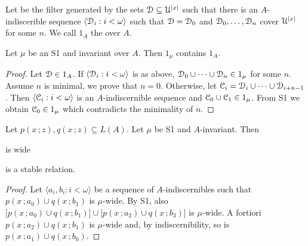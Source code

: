 \documentclass{amsproc}
\renewcommand*{\emph}[1]{%
   \smash{\tikz[baseline]\node[rectangle, fill=teal!25, rounded corners, inner xsep=0.5ex, inner ysep=0.2ex, anchor=base, minimum height = 2.7ex]{\strut #1};}}
\begin{document}
\begin{definition}
  Let \emph{$1_A$\/} be the filter generated by the sets $\EuScript D\subseteq\EuScript U^{|x|}$ such that there is an $A$-indiscerible sequence $\langle \EuScript D_i:i<\omega\rangle$ such that $\EuScript D=\EuScript D_0$ and $\EuScript D_0,\dots,\EuScript D_n$ cover $\EuScript U^{|x|}$ for some $n$.
  We call $1_A$ the \emph{nonforking filter\/} over $A$.
\end{definition}

\begin{fact}
  Let $\mu$ be an S1 and invariant over $A$.
  Then $1_\mu$ contains $1_A$.
\end{fact}

\begin{proof}
  Let $\EuScript D\in 1_A$. 
  If $\langle \EuScript D_i:i<\omega\rangle$ is as above, $\EuScript D_0\cup\dots\cup\EuScript D_n\in1_\mu$ for some $n$.
  Assume $n$ is minimal, we prove that $n=0$.
  Otherwise, let $\EuScript C_i=\EuScript D_i\cup\dots\cup\EuScript D_{i+n-1}$.
  Then $\langle \EuScript C_i:i<\omega\rangle$ is an $A$-indiscernible sequence and $\EuScript C_0\cup\EuScript C_1\in1_\mu$.
  From S1 we obtain $\EuScript C_0\in1_\mu$ which contradicts the minimality of $n$.
\end{proof}

\begin{theorem}
  Let $p(x\,;z), q(x\,;z)\subseteq L(A)$.
  Let $\mu$ be S1 and $A$-invariant.
  Then 

   is wide

  is a stable relation.
\end{theorem}

\begin{proof}
  Let $\langle a_i,b_i: i<\omega\rangle$ be a sequence of $A$-indiscernibles such that $p(x\,;a_0)\cup q(x\,;b_1)$ is $\mu$-wide.
  By S1, also $\big[p(x\,;a_0)\cup q(x\,;b_1)\big]\cup\big[p(x\,;a_2)\cup q(x\,;b_3)\big]$ is $\mu$-wide.
  A fortiori $p(x\,;a_2)\cup q(x\,;b_1)$ is $\mu$-wide and, by indiscernibility, so is $p(x\,;a_1)\cup q(x\,;b_0)$.
\end{proof}
\end{document}

